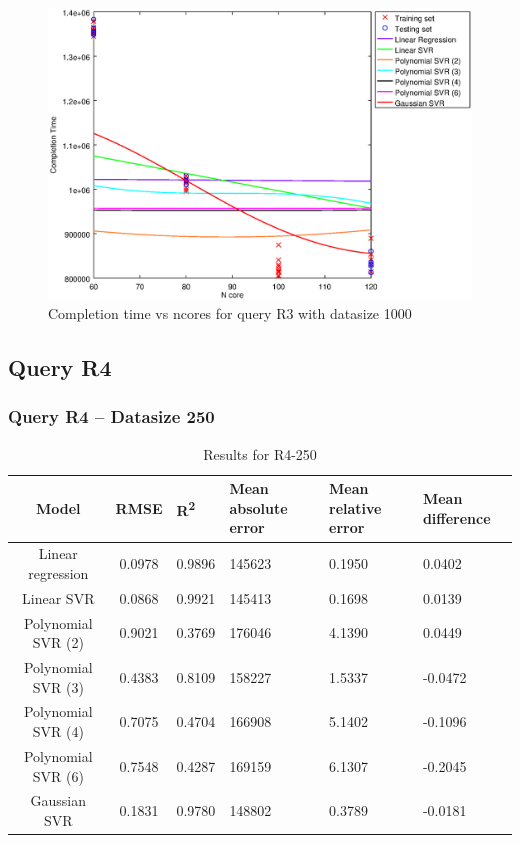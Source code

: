 \documentclass[a4paper,11pt]{article}
\begin{document}
\begin {figure}[hbtp]
\centering
\includegraphics[width=\textwidth]{output/R3_1000_LINEAR_NCORE/plot_R3_1000.eps}
\caption{Completion time vs ncores for query R3 with datasize 1000}
\label{fig:all_linear_R3_1000}
\end {figure}

\newpage
\subsection{Query R4}
\subsubsection{Query R4 -- Datasize 250}
\begin{table}[H]
	\centering
	\begin{adjustbox}{center}
		\begin{tabular}{c | c M{1.2cm} M{2.5cm} M{2.5cm} M{1.8cm}}
			Model & RMSE & R\textsuperscript{2} & Mean absolute error & Mean relative error & Mean difference \tabularnewline
			\hline
			Linear regression & 0.0978 & 0.9896 & 145623 & 0.1950 & 0.0402 \\
			Linear SVR & 0.0868 & 0.9921 & 145413 & 0.1698 & 0.0139 \\
			Polynomial SVR (2) & 0.9021 & 0.3769 & 176046 & 4.1390 & 0.0449 \\
			Polynomial SVR (3) & 0.4383 & 0.8109 & 158227 & 1.5337 & -0.0472 \\
			Polynomial SVR (4) & 0.7075 & 0.4704 & 166908 & 5.1402 & -0.1096 \\
			Polynomial SVR (6) & 0.7548 & 0.4287 & 169159 & 6.1307 & -0.2045 \\
			Gaussian SVR & 0.1831 & 0.9780 & 148802 & 0.3789 & -0.0181 \\
		\end{tabular}
	\end{adjustbox}
	\\
	\caption{Results for R4-250}
	\label{fig:all_linear_R4_250}
\end{table}
\end{document}
